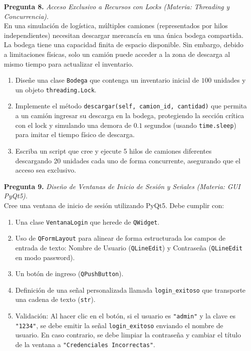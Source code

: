 \documentclass[12pt,letterpaper]{article}
\begin{document}
\bigskip

\textbf{Pregunta 8.} \textit{Acceso Exclusivo a Recursos con Locks (Materia: Threading y Concurrencia).} \\
En una simulación de logística, múltiples camiones (representados por hilos independientes) necesitan descargar mercancía en una única bodega compartida. La bodega tiene una capacidad finita de espacio disponible. Sin embargo, debido a limitaciones físicas, solo un camión puede acceder a la zona de descarga al mismo tiempo para actualizar el inventario.
\begin{enumerate}[label=\alph*)]
  \item Diseñe una clase \texttt{Bodega} que contenga un inventario inicial de $100$ unidades y un objeto \texttt{threading.Lock}.
  \item Implemente el método \texttt{descargar(self, camion\_id, cantidad)} que permita a un camión ingresar su descarga en la bodega, protegiendo la sección crítica con el lock y simulando una demora de $0.1$ segundos (usando \texttt{time.sleep}) para imitar el tiempo físico de descarga.
  \item Escriba un script que cree y ejecute 5 hilos de camiones diferentes descargando 20 unidades cada uno de forma concurrente, asegurando que el acceso sea exclusivo.
\end{enumerate}

\bigskip

\textbf{Pregunta 9.} \textit{Diseño de Ventanas de Inicio de Sesión y Señales (Materia: GUI PyQt5).} \\
Cree una ventana de inicio de sesión utilizando PyQt5. Debe cumplir con:
\begin{enumerate}[label=\alph*)]
  \item Una clase \texttt{VentanaLogin} que herede de \texttt{QWidget}.
  \item Uso de \texttt{QFormLayout} para alinear de forma estructurada los campos de entrada de texto: Nombre de Usuario (\texttt{QLineEdit}) y Contraseña (\texttt{QLineEdit} en modo password).
  \item Un botón de ingreso (\texttt{QPushButton}).
  \item Definición de una señal personalizada llamada \texttt{login\_exitoso} que transporte una cadena de texto (\texttt{str}).
  \item Validación: Al hacer clic en el botón, si el usuario es \texttt{"admin"} y la clave es \texttt{"1234"}, se debe emitir la señal \texttt{login\_exitoso} enviando el nombre de usuario. En caso contrario, se debe limpiar la contraseña y cambiar el título de la ventana a \texttt{"Credenciales Incorrectas"}.
\end{enumerate}
\end{document}
